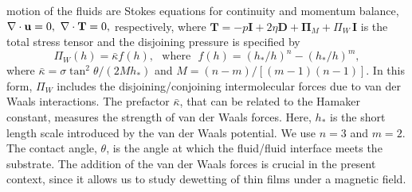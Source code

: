 motion of the fluids are Stokes equations for continuity and momentum balance, $ \nabla \cdot {\bf{u}} = 0,\ \nabla \cdot \mathbf{T} = 0,$ respectively,
where $\mathbf{T} = -p \mathbf{I} + 2\eta {\mathbf D}  + \mathbf{\Pi}_M + \Pi_W\, \mathbf{I}$ 
is the total stress tensor and the disjoining pressure is specified by 
\begin{equation}
\label{eq:vdw}
\Pi_W \left( h \right)= \bar \kappa f\left( h \right), \,\,\,\,\mbox{where} \,\,\,\, f\left( h \right) =  \left( {h_*}/{h} \right)^n - \left( {h_*}/{h} \right)^m , \nonumber
\end{equation}
where $\bar \kappa = { \sigma \tan^2 \theta }/{\left(2 M {h}_* \right)}$ and $M = {\left(n - m\right)}/{\left[ \left( m - 1 \right)\left( n - 1 \right) \right]}.$
In this form, $\Pi_W$ includes the disjoining/conjoining intermolecular forces due to van der Waals interactions. 
The prefactor $\bar \kappa $, that can 
be related to the Hamaker constant,  measures the strength of van der Waals forces. Here,  $h_*$ is the short length scale introduced by the van der Waals potential.  We use $n=3$ and $m=2$.     
The contact angle, $\theta$, is the angle at which the fluid/fluid interface meets the substrate.
The addition of the van der Waals forces is crucial in the 
present context, since it allows us to study dewetting of thin films under a magnetic field. 

